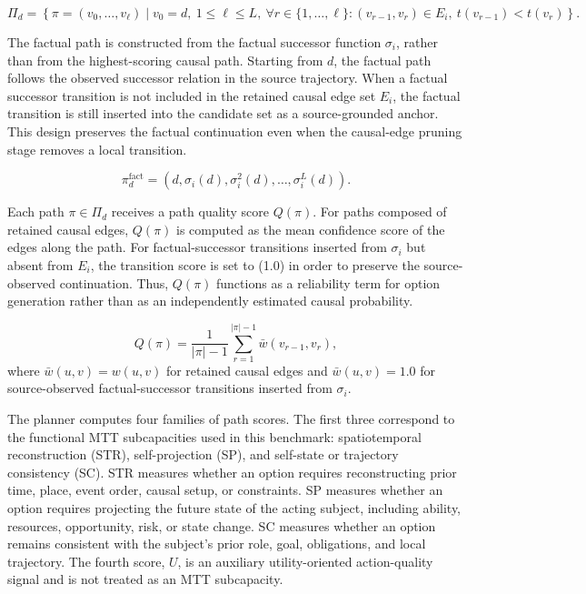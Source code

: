 \documentclass[pdflatex,sn-mathphys-num]{sn-jnl}%
\theoremstyle{thmstyleone}%
\theoremstyle{thmstyletwo}%
\theoremstyle{thmstylethree}%
\begin{document}
\begin{equation}
\Pi_d=\left\{\pi=(v_0,\ldots,v_\ell)\mid v_0=d,\ 1\le \ell\le L,\ \forall r\in\{1,\ldots,\ell\}:(v_{r-1},v_r)\in E_i,\ t(v_{r-1})<t(v_r)\right\}.
\end{equation}

The factual path is constructed from the factual successor function $\sigma_i$, rather than from the highest-scoring causal path. Starting from $d$, the factual path follows the observed successor relation in the source trajectory. When a factual successor transition is not included in the retained causal edge set $E_i$, the factual transition is still inserted into the candidate set as a source-grounded anchor. This design preserves the factual continuation even when the causal-edge pruning stage removes a local transition.

\begin{equation}
\pi_d^{\mathrm{fact}}=(d,\sigma_i(d),\sigma_i^2(d),\ldots,\sigma_i^{L}(d)).
\end{equation}

Each path $\pi\in\Pi_d$ receives a path quality score $Q(\pi)$. For paths composed of retained causal edges, $Q(\pi)$ is computed as the mean confidence score of the edges along the path. For factual-successor transitions inserted from $\sigma_i$ but absent from $E_i$, the transition score is set to (1.0) in order to preserve the source-observed continuation. Thus, $Q(\pi)$ functions as a reliability term for option generation rather than as an independently estimated causal probability.

\begin{equation}
Q(\pi)=\frac{1}{|\pi|-1}\sum_{r=1}^{|\pi|-1} \bar{w}(v_{r-1},v_r),
\end{equation}
where $\bar{w}(u,v)=w(u,v)$ for retained causal edges and $\bar{w}(u,v)=1.0$ for source-observed factual-successor transitions inserted from $\sigma_i$.

The planner computes four families of path scores. The first three correspond to the functional MTT subcapacities used in this benchmark: spatiotemporal reconstruction (STR), self-projection (SP), and self-state or trajectory consistency (SC). STR measures whether an option requires reconstructing prior time, place, event order, causal setup, or constraints. SP measures whether an option requires projecting the future state of the acting subject, including ability, resources, opportunity, risk, or state change. SC measures whether an option remains consistent with the subject's prior role, goal, obligations, and local trajectory. The fourth score, $U$, is an auxiliary utility-oriented action-quality signal and is not treated as an MTT subcapacity.
\end{document}
